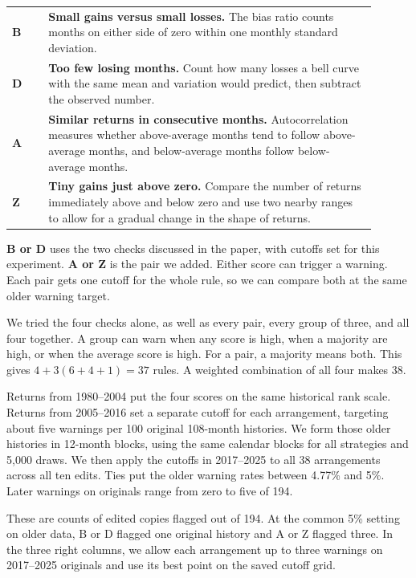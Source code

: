 \documentclass[11pt,letterpaper]{article}
\newcommand{\subhead}[1]{\vspace{3pt}{\large\bfseries #1}\par}
\begin{document}
\begin{tabular}{@{}lp{0.9\linewidth}@{}}
\textbf{B} & \textbf{Small gains versus small losses.} The bias ratio counts months on either side of zero within one monthly standard deviation.\\
\textbf{D} & \textbf{Too few losing months.} Count how many losses a bell curve with the same mean and variation would predict, then subtract the observed number.\\
\textbf{A} & \textbf{Similar returns in consecutive months.} Autocorrelation measures whether above-average months tend to follow above-average months, and below-average months follow below-average months.\\
\textbf{Z} & \textbf{Tiny gains just above zero.} Compare the number of returns immediately above and below zero and use two nearby ranges to allow for a gradual change in the shape of returns.
\end{tabular}

\textbf{B or D} uses the two checks discussed in the paper, with cutoffs set for this experiment. \textbf{A or Z} is the pair we added. Either score can trigger a warning. Each pair gets one cutoff for the whole rule, so we can compare both at the same older warning target.

We tried the four checks alone, as well as every pair, every group of three, and all four together. A group can warn when any score is high, when a majority are high, or when the average score is high. For a pair, a majority means both. This gives $4+3(6+4+1)=37$ rules. A weighted combination of all four makes 38.

\subhead{Set the warning levels on older returns and count later warnings}
Returns from 1980--2004 put the four scores on the same historical rank scale. Returns from 2005--2016 set a separate cutoff for each arrangement, targeting about five warnings per 100 original 108-month histories. We form those older histories in 12-month blocks, using the same calendar blocks for all strategies and 5,000 draws. We then apply the cutoffs in 2017--2025 to all 38 arrangements across all ten edits. Ties put the older warning rates between 4.77\% and 5\%. Later warnings on originals range from zero to five of 194.

\newpage
\subhead{What changes when we look at all ten edits?}
These are counts of edited copies flagged out of 194. At the common 5\% setting on older data, B or D flagged one original history and A or Z flagged three. In the three right columns, we allow each arrangement up to three warnings on 2017--2025 originals and use its best point on the saved cutoff grid.
\end{document}
